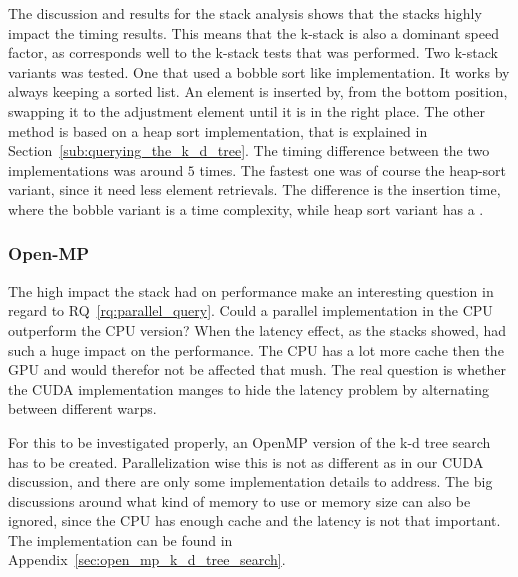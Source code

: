 The discussion and results for the stack analysis shows that the stacks highly impact the timing results. This means that the k-stack is also a dominant  speed factor, as corresponds well to the k-stack tests that was performed. Two k-stack variants was tested. One that used a bobble sort\cite{Cormen:2001} like implementation. It works by always keeping a sorted list. An element is inserted by, from the bottom position, swapping it to the adjustment element until it is in the right place. The other method is based on a heap sort implementation, that is explained in Section~\ref{sub:querying_the_k_d_tree}. The timing difference between the two implementations was around $5$ times. The fastest one was of course the heap-sort variant, since it need less element retrievals. The difference is the insertion time, where the bobble variant is a  time complexity, while heap sort variant has a .


\subsubsection{Open-MP} %
\label{ssub:open_mp_version}

The high impact the stack had on performance make an interesting question in regard to RQ~\ref{rq:parallel_query}. Could a parallel implementation in the CPU outperform the CPU version? When the latency effect, as the stacks showed, had such a huge impact on the performance. The CPU has a lot more cache then the GPU and would therefor not be affected that mush. The real question is whether the CUDA implementation manges to hide the latency problem by alternating between different warps.

For this to be investigated properly, an OpenMP version of the k-d tree search has to be created. Parallelization wise this is not as different as in our CUDA discussion, and there are only some implementation details to address. The big discussions around what kind of memory to use or memory size can also be ignored, since the CPU has enough cache and the latency is not that important. The implementation can be found in Appendix~\ref{sec:open_mp_k_d_tree_search}.















